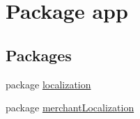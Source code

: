 \hypertarget{namespaceapp}{\section{Package app}
\label{namespaceapp}
}
\subsection*{Packages}
\begin{DoxyCompactItemize}
\item 
package \hyperlink{namespaceapp_1_1localization}{localization}
\item 
package \hyperlink{namespaceapp_1_1merchant_localization}{merchant\-Localization}
\end{DoxyCompactItemize}
